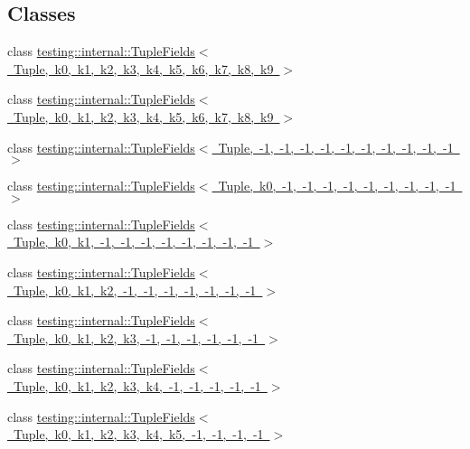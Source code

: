 \subsection*{Classes}
\begin{DoxyCompactItemize}
\item 
class \mbox{\hyperlink{classtesting_1_1internal_1_1_tuple_fields}{testing\+::internal\+::\+Tuple\+Fields$<$ Tuple, k0, k1, k2, k3, k4, k5, k6, k7, k8, k9 $>$}}
\item 
class \mbox{\hyperlink{classtesting_1_1internal_1_1_tuple_fields}{testing\+::internal\+::\+Tuple\+Fields$<$ Tuple, k0, k1, k2, k3, k4, k5, k6, k7, k8, k9 $>$}}
\item 
class \mbox{\hyperlink{classtesting_1_1internal_1_1_tuple_fields_3_01_tuple_00_01-1_00_01-1_00_01-1_00_01-1_00_01-1_00_c541d4fe72f9dece2f1a50ee33bb16df}{testing\+::internal\+::\+Tuple\+Fields$<$ Tuple, -\/1, -\/1, -\/1, -\/1, -\/1, -\/1, -\/1, -\/1, -\/1, -\/1 $>$}}
\item 
class \mbox{\hyperlink{classtesting_1_1internal_1_1_tuple_fields_3_01_tuple_00_01k0_00_01-1_00_01-1_00_01-1_00_01-1_00_079b3e59a7bb10f5d0d7a5843be2be9d}{testing\+::internal\+::\+Tuple\+Fields$<$ Tuple, k0, -\/1, -\/1, -\/1, -\/1, -\/1, -\/1, -\/1, -\/1, -\/1 $>$}}
\item 
class \mbox{\hyperlink{classtesting_1_1internal_1_1_tuple_fields_3_01_tuple_00_01k0_00_01k1_00_01-1_00_01-1_00_01-1_00_bfbbbfc9cc03949b0b1ff3620709d8ff}{testing\+::internal\+::\+Tuple\+Fields$<$ Tuple, k0, k1, -\/1, -\/1, -\/1, -\/1, -\/1, -\/1, -\/1, -\/1 $>$}}
\item 
class \mbox{\hyperlink{classtesting_1_1internal_1_1_tuple_fields_3_01_tuple_00_01k0_00_01k1_00_01k2_00_01-1_00_01-1_00_897bcaf4b51057696318fe39b8a2dc88}{testing\+::internal\+::\+Tuple\+Fields$<$ Tuple, k0, k1, k2, -\/1, -\/1, -\/1, -\/1, -\/1, -\/1, -\/1 $>$}}
\item 
class \mbox{\hyperlink{classtesting_1_1internal_1_1_tuple_fields_3_01_tuple_00_01k0_00_01k1_00_01k2_00_01k3_00_01-1_00_d404aa1c50b4758daf5bb2f78d0fb44c}{testing\+::internal\+::\+Tuple\+Fields$<$ Tuple, k0, k1, k2, k3, -\/1, -\/1, -\/1, -\/1, -\/1, -\/1 $>$}}
\item 
class \mbox{\hyperlink{classtesting_1_1internal_1_1_tuple_fields_3_01_tuple_00_01k0_00_01k1_00_01k2_00_01k3_00_01k4_00_24d73e0cd5fb480b4f69b3d189a737e1}{testing\+::internal\+::\+Tuple\+Fields$<$ Tuple, k0, k1, k2, k3, k4, -\/1, -\/1, -\/1, -\/1, -\/1 $>$}}
\item 
class \mbox{\hyperlink{classtesting_1_1internal_1_1_tuple_fields_3_01_tuple_00_01k0_00_01k1_00_01k2_00_01k3_00_01k4_00_fc3c297a037e5312ea5ea32562e3997e}{testing\+::internal\+::\+Tuple\+Fields$<$ Tuple, k0, k1, k2, k3, k4, k5, -\/1, -\/1, -\/1, -\/1 $>$}}

\end{DoxyCompactItemize}
